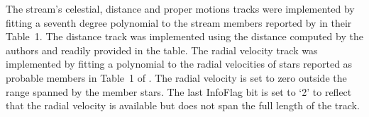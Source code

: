 The stream's celestial, distance and proper motions tracks were implemented by fitting a seventh degree polynomial to the stream members reported by \citet{Ibata2021} in their Table~1. The distance track was implemented using the distance computed by the authors and readily provided in the table. The radial velocity track was implemented by fitting a polynomial to the radial velocities of stars reported as probable members in Table~1 of \citet{Ibata2019}. The radial velocity is set to zero outside the range spanned by the member stars. The last InfoFlag bit is set to `2' to reflect that the radial velocity is available but does not span the full length of the track.

